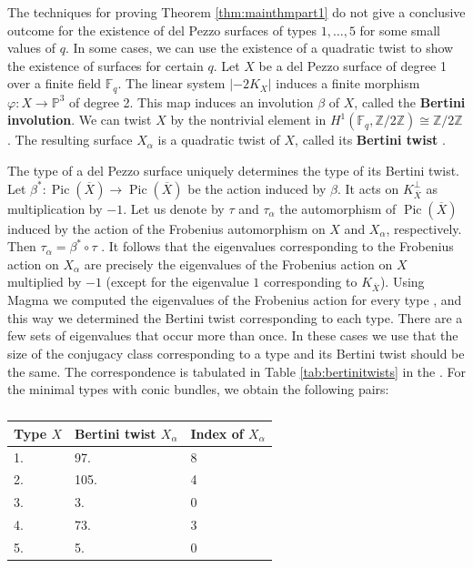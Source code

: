 \documentclass[a4paper, 11pt, reqno]{amsart}
\numberwithin{equation}{section} \numberwithin{figure}{section}
\newcommand{\term}[1]{\textbf{#1}}          %
\DeclareMathOperator{\Pic}{Pic}
\def \F {{\mathbb F}}
\def \P {{\mathbb P}}
\def \Z {{\mathbb Z}}
\newcommand{\ra}{\rightarrow}
\theoremstyle{definition}
\numberwithin{lemma}{section}
\begin{document}
The techniques for proving Theorem \ref{thm:mainthmpart1} do not give a conclusive outcome for the existence of del Pezzo surfaces of types $1, \ldots, 5$ for some small values of $q$. In some cases, we can use the existence of a quadratic twist to show the existence of surfaces for certain $q$. 
Let $X$ be a del Pezzo surface of degree 1 over a finite field $\F_q$. The linear system $|-2K_X|$ induces a finite morphism $\varphi \colon X \ra \P^3$ of degree 2. This map induces an involution $\beta$ of $X$, called the \term{Bertini involution}. We can twist $X$ by the nontrivial element in $H^1(\F_q, \Z/2\Z) \cong \Z/2\Z$. The resulting surface $X_\alpha$ is a quadratic twist of $X$, called its \term{Bertini twist} \cite[\S5.1.1]{BFL}.

The type of a del Pezzo surface uniquely determines the type of its Bertini twist. Let $\beta^* \colon \Pic(\overline{X}) \ra \Pic(\overline{X})$ be the action induced by $\beta$. It acts on $K_{\overline{X}}^\perp$ as multiplication by $-1$. Let us denote by $\tau$ and $\tau_\alpha$ the automorphism of $\Pic(\overline{X})$ induced by the action of the Frobenius automorphism on $X$ and $X_\alpha$, respectively. Then $\tau_\alpha = \beta^* \circ \tau$ \cite[Proposition 4.4]{rybakovtrepalin}. It follows that the eigenvalues corresponding to the Frobenius action on $X_\alpha$ are precisely the eigenvalues of the Frobenius action on $X$ multiplied by $-1$ (except for the eigenvalue $1$ corresponding to $K_{\overline{X}}$). Using Magma we computed the eigenvalues of the Frobenius action for every type \cite{github_Existence_dP1}, and this way we determined the Bertini twist corresponding to each type. There are a few sets of eigenvalues that occur more than once. In these cases we use that the size of the conjugacy class corresponding to a type and its Bertini twist should be the same. The correspondence is tabulated in Table \ref{tab:bertinitwists} in the . For the minimal types with conic bundles, we obtain the following pairs:
\begin{table}[h]
    \centering
    \begin{tabular}{l|l|l}
         Type $X$ & Bertini twist $X_\alpha$ & Index of $X_\alpha$\\
         \hline
         1. & 97. & 8 \\
         2. & 105.  & 4\\
         3. & 3. & 0\\
         4. & 73. & 3\\
         5. & 5. & 0\\
\end{tabular}
    \caption{}
    \label{tab:Bertinitwistsconicbundles}
\end{table}
\end{document}
